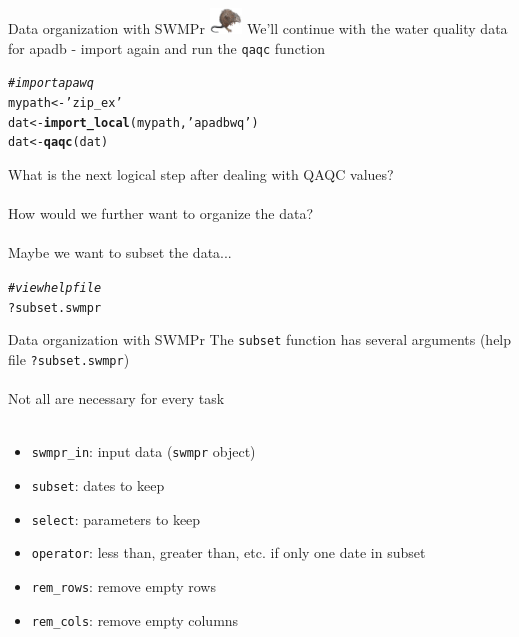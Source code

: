\documentclass[xcolor=dvipsnames]{beamer}\usepackage[]{graphicx}\usepackage[]{color}
\makeatletter
\newcommand{\hlstr}[1]{\textcolor[rgb]{0.192,0.494,0.8}{#1}}%
\newcommand{\hlcom}[1]{\textcolor[rgb]{0.678,0.584,0.686}{\textit{#1}}}%
\newcommand{\hlopt}[1]{\textcolor[rgb]{0,0,0}{#1}}%
\newcommand{\hlstd}[1]{\textcolor[rgb]{0.345,0.345,0.345}{#1}}%
\newcommand{\hlkwb}[1]{\textcolor[rgb]{0.69,0.353,0.396}{#1}}%
\newcommand{\hlkwd}[1]{\textcolor[rgb]{0.737,0.353,0.396}{\textbf{#1}}}%
\newenvironment{kframe}{%
 \def\at@end@of@kframe{}%
 \ifinner\ifhmode%
  \def\at@end@of@kframe{\end{minipage}}%
  \begin{minipage}{\columnwidth}%
 \fi\fi%
 \def\FrameCommand##1{\hskip\@totalleftmargin \hskip-\fboxsep
 \colorbox{shadecolor}{##1}\hskip-\fboxsep
     \hskip-\linewidth \hskip-\@totalleftmargin \hskip\columnwidth}%
 \MakeFramed {\advance\hsize-\width
   \@totalleftmargin\z@ \linewidth\hsize
   \@setminipage}}%
 {\par\unskip\endMakeFramed%
 \at@end@of@kframe}
\newenvironment{knitrout}{}{} %
\makeatother
\begin{document}
\begin{frame}[fragile]{Data organization with SWMPr \includegraphics[width = 0.065\textwidth]{imgs/swmprat.png}} 
\onslide<+->
We'll continue with the water quality data for apadb - import again and run the \texttt{qaqc} function
\onslide<+->
\begin{knitrout}\scriptsize
{}\color{fgcolor}\begin{kframe}
\begin{alltt}
\hlcom{# import apawq}
\hlstd{mypath} \hlkwb{<-} \hlstr{'zip_ex'}
\hlstd{dat} \hlkwb{<-} \hlkwd{import_local}\hlstd{(mypath,} \hlstr{'apadbwq'}\hlstd{)}
\hlstd{dat} \hlkwb{<-} \hlkwd{qaqc}\hlstd{(dat)}
\end{alltt}
\end{kframe}
\end{knitrout}
\onslide<+->
What is the next logical step after dealing with QAQC values? \\~\\
How would we further want to organize the data? \\~\\
\onslide<+->
Maybe we want to subset the data... 
\begin{knitrout}\scriptsize
{}\color{fgcolor}\begin{kframe}
\begin{alltt}
\hlcom{# view help file}
\hlopt{?}\hlstd{subset.swmpr}
\end{alltt}
\end{kframe}
\end{knitrout}
\end{frame}

\begin{frame}[fragile]{Data organization with SWMPr}
The \texttt{subset} function has several arguments (help file \texttt{?subset.swmpr})\\~\\
Not all are necessary for every task \\~\\
\begin{itemize}
\item \texttt{swmpr\_in}: input data (\texttt{swmpr} object)
\item \texttt{subset}: dates to keep
\item \texttt{select}: parameters to keep
\item \texttt{operator}: less than, greater than, etc. if only one date in subset
\item \texttt{rem\_rows}: remove empty rows
\item \texttt{rem\_cols}: remove empty columns \\~\\
\end{itemize}
\end{frame}
\end{document}
